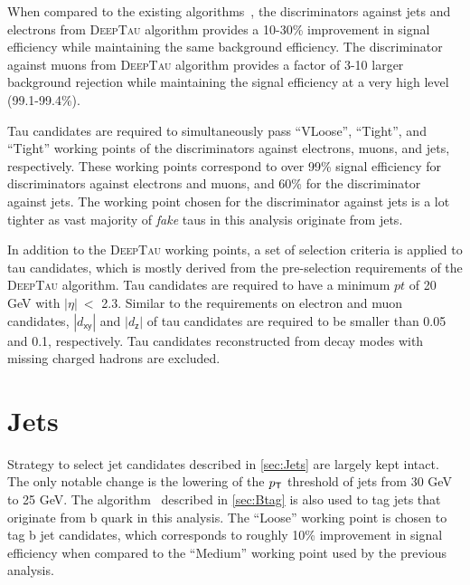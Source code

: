When compared to the existing algorithms~\cite{CMS:2018jrd,CMS:2015pac}, the discriminators against jets and electrons from \textsc{DeepTau} algorithm provides a 10-30\% improvement in signal efficiency while maintaining the same background efficiency. The discriminator against muons from \textsc{DeepTau} algorithm provides a factor of 3-10 larger background rejection while maintaining the signal efficiency at a very high level (99.1-99.4\%).

Tau candidates are required to simultaneously pass ``VLoose'', ``Tight'', and ``Tight'' working points of the discriminators against electrons, muons, and jets, respectively. These working points correspond to over 99\% signal efficiency for discriminators against electrons and muons, and 60\% for the discriminator against jets. The working point chosen for the discriminator against jets is a lot tighter as vast majority of \emph{fake} taus in this analysis originate from jets.

In addition to the \textsc{DeepTau} working points, a set of selection criteria is applied to tau candidates, which is mostly derived from the pre-selection requirements of the \textsc{DeepTau} algorithm. Tau candidates are required to have a minimum $pt$ of 20 GeV with $|\eta|~<$ 2.3. Similar to the requirements on electron and muon candidates, $|d_{\textsf{xy}}|$ and $|d_{\textsf{z}}|$ of tau candidates are required to be smaller than 0.05 and 0.1, respectively. Tau candidates reconstructed from decay modes with missing charged hadrons are excluded.

\section{Jets}
\label{sec:JME}

Strategy to select jet candidates described in \autoref{sec:Jets} are largely kept intact. The only notable change is the lowering of the $p_{\textsf{T}}$ threshold of jets from 30 GeV to 25 GeV. The \DeepJ algorithm~\cite{Bols:2020bkb} described in \autoref{sec:Btag} is also used to tag jets that originate from b quark in this analysis. The ``Loose'' working point is chosen to tag b jet candidates, which corresponds to roughly 10\% improvement in signal efficiency when compared to the ``Medium'' working point used by the previous analysis.



